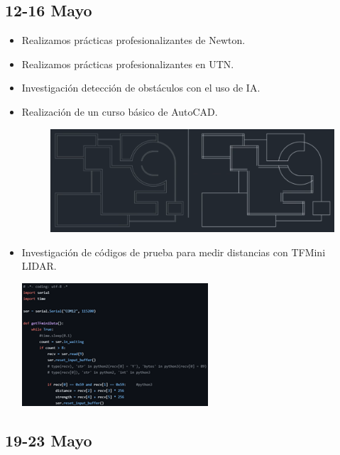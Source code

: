\documentclass[12pt,a4paper]{article}
\begin{document}
\subsection*{12-16 Mayo}
\begin{itemize}

\item Realizamos prácticas profesionalizantes  de Newton.
\item Realizamos prácticas profesionalizantes en UTN.
\item Investigación detección de obstáculos con el uso de IA.
\item Realización de un curso básico de AutoCAD.
\begin{figure}[H]
    \centering
    \includegraphics[width=\linewidth]{Carpeta de campo/Curso AutoCad.png}
\end{figure}
\item Investigación de códigos de prueba para medir distancias con TFMini LIDAR.

\includegraphics[scale=1]{Carpeta de campo/Imagen9.png}
\end{itemize}

\subsection*{19-23 Mayo}
\end{document}
